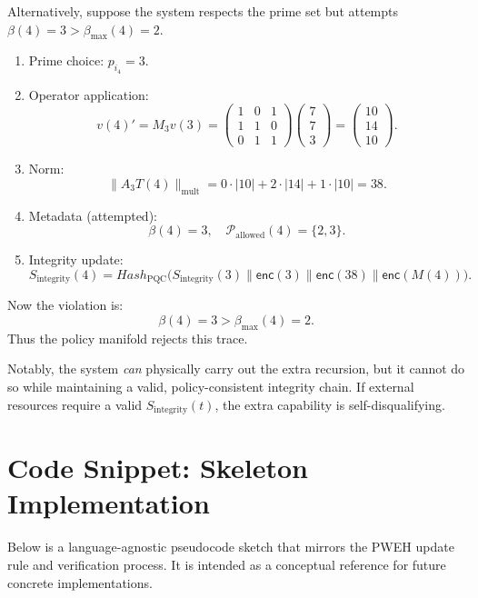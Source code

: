 \documentclass[11pt]{article}
\begin{document}
Alternatively, suppose the system respects the prime set but attempts \(\beta(4)=3>\beta_{\max}(4)=2\).

\begin{enumerate}[leftmargin=1.5em]
  \item Prime choice: \(p_{i_4} = 3\).
  \item Operator application:
  \[
    v(4)' = M_3 v(3) =
    \begin{pmatrix}
    1 & 0 & 1 \\
    1 & 1 & 0 \\
    0 & 1 & 1
    \end{pmatrix}
    \begin{pmatrix}7\\7\\3\end{pmatrix}
    = \begin{pmatrix}10\\14\\10\end{pmatrix}.
  \]
  \item Norm:
  \[
    \|A_{3}T(4)\|_{\text{mult}} =
    0\cdot|10| + 2\cdot|14| + 1\cdot|10| = 38.
  \]
  \item Metadata (attempted):
  \[
    \beta(4) = 3, \quad
    \mathcal{P}_{\text{allowed}}(4) = \{2,3\}.
  \]
  \item Integrity update:
  \[
    S_{\text{integrity}}(4)
    = Hash_{\text{PQC}}\big(
      S_{\text{integrity}}(3) \parallel \mathsf{enc}(3)\parallel \mathsf{enc}(38)\parallel \mathsf{enc}(M(4))
    \big).
  \]
\end{enumerate}

Now the violation is:
\[
  \beta(4) = 3 > \beta_{\max}(4) = 2.
\]
Thus the policy manifold rejects this trace.

Notably, the system \emph{can} physically carry out the extra recursion, but it cannot do so while maintaining a valid, policy-consistent integrity chain.
If external resources require a valid \(S_{\text{integrity}}(t)\), the extra capability is self-disqualifying.

\section{Code Snippet: Skeleton Implementation}

Below is a language-agnostic pseudocode sketch that mirrors the PWEH update rule and verification process.
It is intended as a conceptual reference for future concrete implementations.
\end{document}

